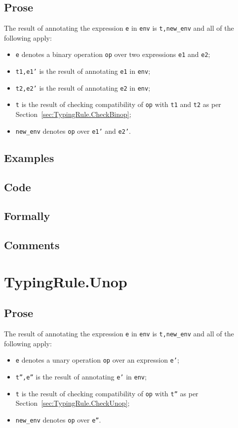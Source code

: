 \documentclass{book}
\begin{document}
  \subsection{Prose}
  The result of annotating the expression \texttt{e} in \texttt{env} is
\texttt{t,new\_env} and all of the following apply:
  \begin{itemize}
  \item \texttt{e} denotes a binary operation \texttt{op} over two expressions \texttt{e1} and \texttt{e2};
  \item \texttt{t1,e1'} is the result of annotating \texttt{e1} in \texttt{env};
  \item \texttt{t2,e2'} is the result of annotating \texttt{e2} in \texttt{env};
  \item \texttt{t} is the result of checking compatibility of \texttt{op} with \texttt{t1} and \texttt{t2} as per Section~\ref{sec:TypingRule.CheckBinop};
  \item \texttt{new\_env} denotes \texttt{op} over \texttt{e1'} and \texttt{e2'}.
  \end{itemize}

  \subsection{Examples}

  \subsection{Code}

  \subsection{Formally}

  \subsection{Comments}

\section{TypingRule.Unop \label{sec:TypingRule.Unop}}

  \subsection{Prose}
  The result of annotating the expression \texttt{e} in \texttt{env} is
\texttt{t,new\_env} and all of the following apply:
  \begin{itemize}
  \item \texttt{e} denotes a unary operation \texttt{op} over an expression \texttt{e'};
  \item \texttt{t'',e''} is the result of annotating \texttt{e'} in \texttt{env};
  \item \texttt{t} is the result of checking compatibility of \texttt{op} with \texttt{t''} as per Section~\ref{sec:TypingRule.CheckUnop};
  \item \texttt{new\_env} denotes \texttt{op} over \texttt{e''}.
  \end{itemize}
\end{document}
